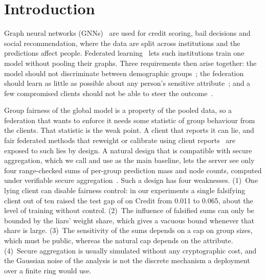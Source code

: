 \section{Introduction}\label{sec:intro}

Graph neural networks (GNNs)~\citep{kipf2016semi,velickovic2017graph} are used for credit scoring, bail decisions and social recommendation, where the data are split across institutions and the predictions affect people. Federated learning~\citep{mcmahan2017communication} lets such institutions train one model without pooling their graphs. Three requirements then arise together: the model should not discriminate between demographic groups~\citep{dai2021say,agarwal2021towards}; the federation should learn as little as possible about any person's sensitive attribute~\citep{abadi2016deep,mcmahan2018learning}; and a few compromised clients should not be able to steer the outcome~\citep{blanchard2017krum,yin2018byzantine,baruch2019little}.

Group fairness of the global model is a property of the pooled data, so a federation that wants to enforce it needs some statistic of group behaviour from the clients. That statistic is the weak point. A client that reports it can lie, and fair federated methods that reweight or calibrate using client reports~\citep{ezzeldin2023fairfed,li2020fair,fedfact2025} are exposed to such lies by design. A natural design that is compatible with secure aggregation, which we call \clamp{} and use as the main baseline, lets the server see only four range-checked sums of per-group prediction mass and node counts, computed under verifiable secure aggregation~\citep{bonawitz2017practical,corrigangibbs2017prio}. Such a design has four weaknesses. (1)~One lying client can disable fairness control: in our experiments a single falsifying client out of ten raised the test gap of \clamp{} on Credit from 0.011 to 0.065, about the level of training without control. (2)~The influence of falsified sums can only be bounded by the liars' weight share, which gives a vacuous bound whenever that share is large. (3)~The sensitivity of the sums depends on a cap on group sizes, which must be public, whereas the natural cap depends on the attribute. (4)~Secure aggregation is usually simulated without any cryptographic cost, and the Gaussian noise of the analysis is not the discrete mechanism a deployment over a finite ring would use.

